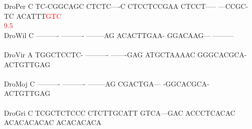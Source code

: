 \documentclass[11pt,twoside,reqno,a4paper]{article}
\begin{document}
{DroPer	C	TC-CGGCAGC	CTCTC----C	CTCCTCCGAA	CTCCT-----	---CCGC-TC	ACATTT\textcolor{Red}{G}\textcolor{Red}{T}\textcolor{Red}{C}\\
\hspace*{7\charwidth}\hspace*{1\charwidth}\hspace*{1\charwidth}\hspace*{1\charwidth}\hspace*{1\charwidth}\hspace*{1\charwidth}\hspace*{1\charwidth}\hspace*{57\charwidth}\textcolor{Red}{9.5}\hspace*{1\charwidth}\\
DroWil	C	----------	----------	--------AG	ACACTTGAA-	GGACAAG---	---------\\
\hspace*{7\charwidth}\hspace*{1\charwidth}\hspace*{1\charwidth}\hspace*{1\charwidth}\hspace*{1\charwidth}\hspace*{1\charwidth}\hspace*{1\charwidth}\\
DroVir	A	TGGCTCCTC-	----------	-------GAG	ATGCTAAAAC	GGGCACGCA-	ACTGTTGAG\\
\hspace*{7\charwidth}\hspace*{1\charwidth}\hspace*{1\charwidth}\hspace*{1\charwidth}\hspace*{1\charwidth}\hspace*{1\charwidth}\hspace*{1\charwidth}\\
DroMoj	C	----------	----------	--------AG	CGACTGA---	-GGCACGCA-	ACTGTTGAG\\
\hspace*{7\charwidth}\hspace*{1\charwidth}\hspace*{1\charwidth}\hspace*{1\charwidth}\hspace*{1\charwidth}\hspace*{1\charwidth}\hspace*{1\charwidth}\\
DroGri	C	TCGCTCTCCC	CTCTTGCATT	GTCA---GAC	ACCCTCACAC	ACACACACAC	ACACACACA\\
}
\end{document}

